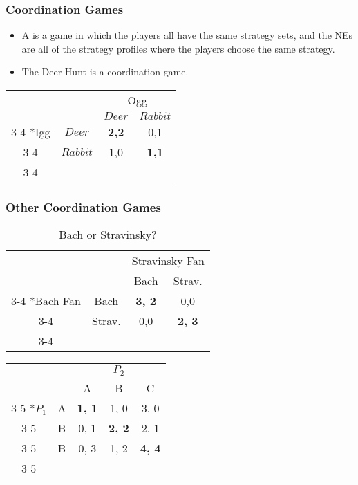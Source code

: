 \begin{frame}
\frametitle{Coordination Games}
\begin{itemize}
	\item A  is a game in which the players all have the same strategy sets, and the NEs are all of the strategy profiles where the players choose the same strategy.
	\item The Deer Hunt is a coordination game.
\end{itemize}
\begin{table}[h]
\centering
\begin{tabular}{cc|c|c|}
	& \multicolumn{1}{c}{} & \multicolumn{2}{c}{Ogg}\\
	& \multicolumn{1}{c}{} & \multicolumn{1}{c}{$Deer$}  & \multicolumn{1}{c}{$Rabbit$} \\\cline{3-4}
	\multirow{2}*{Igg}  & $Deer$ & \colorbox{blue!25}{\textbf{2,2}} & 0,1 \\\cline{3-4}
	& $Rabbit$ & 1,0 & \colorbox{blue!25}{\textbf{1,1}} \\\cline{3-4}
\end{tabular}
\end{table}
\end{frame}

\begin{frame}
\frametitle{Other Coordination Games}
\begin{table}[h]
	\caption*{Bach or Stravinsky?}
	\centering
	\begin{tabular}{cc|c|c|}
		& \multicolumn{1}{c}{} & \multicolumn{2}{c}{Stravinsky Fan}\\
		& \multicolumn{1}{c}{} & \multicolumn{1}{c}{Bach}  & \multicolumn{1}{c}{Strav.} \\\cline{3-4}
		\multirow{2}*{Bach Fan}  & Bach & \colorbox{blue!25}{\textbf{3, 2}} & 0,0 \\\cline{3-4}
		& Strav. & 0,0 & \colorbox{blue!25}{\textbf{2, 3}} \\\cline{3-4}
	\end{tabular}
\end{table}
\begin{table}[h]
	\centering
	\begin{tabular}{cc|c|c|c|}
		& \multicolumn{1}{c}{} & \multicolumn{3}{c}{$P_2$}\\
		& \multicolumn{1}{c}{} & \multicolumn{1}{c}{A}  & \multicolumn{1}{c}{B}  & \multicolumn{1}{c}{C} \\\cline{3-5}
		\multirow{2}*{$P_1$}  & A & \colorbox{blue!25}{\textbf{1, 1}} & 1, 0 & 3, 0 \\\cline{3-5}
		& B & 0, 1 & \colorbox{blue!25}{\textbf{2, 2}} & 2, 1 \\\cline{3-5}
		& B & 0, 3 & 1, 2 & \colorbox{blue!25}{\textbf{4, 4}} \\\cline{3-5}
	\end{tabular}
\end{table}
\end{frame}


